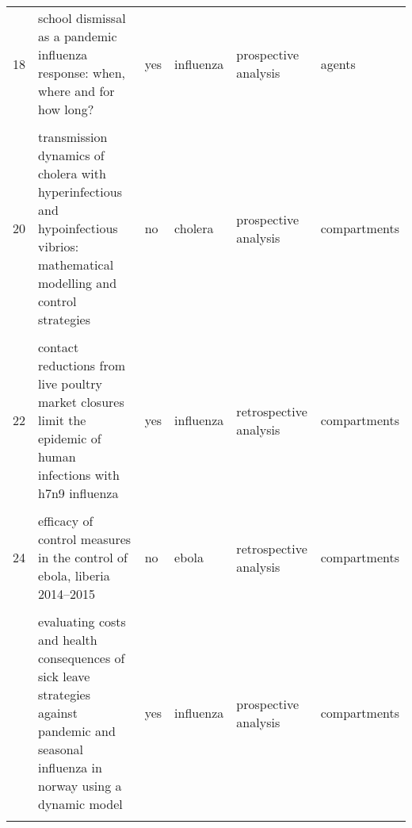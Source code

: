 \documentclass[
]{article}
\begin{document}
\begin{landscape}
\begin{longtable}{l>{\raggedright\arraybackslash}p{3.3cm}l>{\raggedright\arraybackslash}p{3.3cm}>{\raggedright\arraybackslash}p{2cm}l}
18 & school dismissal as a pandemic influenza response: when, where and for how long? & yes & influenza & prospective analysis & agents\\
\cellcolor{gray!6}{19} & \cellcolor{gray!6}{study on modeling simulation and optimal control method for the transmission risk of the ebola virus} & \cellcolor{gray!6}{no} & \cellcolor{gray!6}{ebola} & \cellcolor{gray!6}{prospective analysis} & \cellcolor{gray!6}{compartments}\\
20 & transmission dynamics of cholera with hyperinfectious and hypoinfectious vibrios: mathematical modelling and control strategies & no & cholera & prospective analysis & compartments\\
\addlinespace
\cellcolor{gray!6}{21} & \cellcolor{gray!6}{a new epidemics–logistics model: insights into controlling the ebola virus disease in west africa} & \cellcolor{gray!6}{no} & \cellcolor{gray!6}{ebola} & \cellcolor{gray!6}{prospective analysis} & \cellcolor{gray!6}{compartments}\\
22 & contact reductions from live poultry market closures limit the epidemic of human infections with h7n9 influenza & yes & influenza & retrospective analysis & compartments\\
\cellcolor{gray!6}{23} & \cellcolor{gray!6}{disparities in spread and control of influenza in slums of delhi: findings from an agent-based modelling study} & \cellcolor{gray!6}{no} & \cellcolor{gray!6}{influenza} & \cellcolor{gray!6}{prospective analysis} & \cellcolor{gray!6}{agents}\\
24 & efficacy of control measures in the control of ebola, liberia 2014–2015 & no & ebola & retrospective analysis & compartments\\
\cellcolor{gray!6}{25} & \cellcolor{gray!6}{epidemiology of the silent polio outbreak in rahat, israel, based on modeling of environmental surveillance data} & \cellcolor{gray!6}{yes} & \cellcolor{gray!6}{poliomyelitis} & \cellcolor{gray!6}{retrospective analysis} & \cellcolor{gray!6}{compartments}\\
\addlinespace
26 & evaluating costs and health consequences of sick leave strategies against pandemic and seasonal influenza in norway using a dynamic model & yes & influenza & prospective analysis & compartments\\
\cellcolor{gray!6}{27} & \cellcolor{gray!6}{evaluating vaccination strategies to control foot-and-mouth disease: a country comparison study} & \cellcolor{gray!6}{yes} & \cellcolor{gray!6}{fmd} & \cellcolor{gray!6}{prospective analysis} & \cellcolor{gray!6}{agents}\\

\end{longtable}
\end{landscape}
\end{document}

